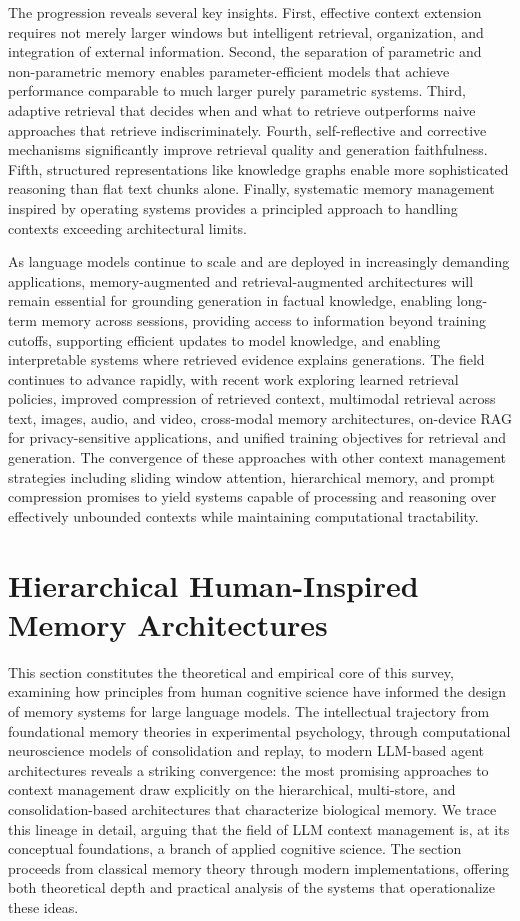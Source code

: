 The progression reveals several key insights. First, effective context extension requires not merely larger windows but intelligent retrieval, organization, and integration of external information. Second, the separation of parametric and non-parametric memory enables parameter-efficient models that achieve performance comparable to much larger purely parametric systems. Third, adaptive retrieval that decides when and what to retrieve outperforms naive approaches that retrieve indiscriminately. Fourth, self-reflective and corrective mechanisms significantly improve retrieval quality and generation faithfulness. Fifth, structured representations like knowledge graphs enable more sophisticated reasoning than flat text chunks alone. Finally, systematic memory management inspired by operating systems provides a principled approach to handling contexts exceeding architectural limits.

As language models continue to scale and are deployed in increasingly demanding applications, memory-augmented and retrieval-augmented architectures will remain essential for grounding generation in factual knowledge, enabling long-term memory across sessions, providing access to information beyond training cutoffs, supporting efficient updates to model knowledge, and enabling interpretable systems where retrieved evidence explains generations. The field continues to advance rapidly, with recent work exploring learned retrieval policies, improved compression of retrieved context, multimodal retrieval across text, images, audio, and video, cross-modal memory architectures, on-device RAG for privacy-sensitive applications, and unified training objectives for retrieval and generation. The convergence of these approaches with other context management strategies including sliding window attention, hierarchical memory, and prompt compression promises to yield systems capable of processing and reasoning over effectively unbounded contexts while maintaining computational tractability.
\section{Hierarchical Human-Inspired Memory Architectures}
\label{sec:hierarchical}

This section constitutes the theoretical and empirical core of this survey, examining how principles from human cognitive science have informed the design of memory systems for large language models. The intellectual trajectory from foundational memory theories in experimental psychology, through computational neuroscience models of consolidation and replay, to modern LLM-based agent architectures reveals a striking convergence: the most promising approaches to context management draw explicitly on the hierarchical, multi-store, and consolidation-based architectures that characterize biological memory. We trace this lineage in detail, arguing that the field of LLM context management is, at its conceptual foundations, a branch of applied cognitive science. The section proceeds from classical memory theory through modern implementations, offering both theoretical depth and practical analysis of the systems that operationalize these ideas.

